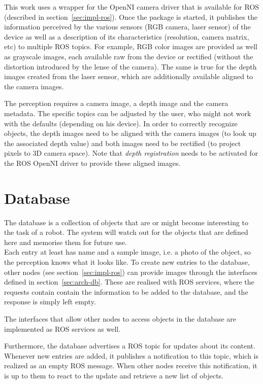 This work uses a wrapper for the OpenNI camera driver that is available for ROS (described in section~\ref{sec:impl-ros}). Once the package is started, it publishes the information perceived by the various sensors (RGB camera, laser sensor) of the device as well as a description of its characteristics (resolution, camera matrix, etc) to multiple ROS topics. For example, RGB color images are provided as well as grayscale images, each available raw from the device or rectified (without the distortion introduced by the lense of the camera). The same is true for the depth images created from the laser sensor, which are additionally available aligned to the camera images.

The perception requires a camera image, a depth image and the camera metadata. The specific topics can be adjusted by the user, who might not work with the defaults (depending on his device). In order to correctly recognize objects, the depth images need to be aligned with the camera images (to look up the associated depth value) and both images need to be rectified (to project pixels to 3D camera space). Note that \textit{depth registration} needs to be activated for the ROS OpenNI driver to provide these aligned images.


\section{Database}
\label{sec:impl-db}
The database is a collection of objects that are or might become interesting to the task of a robot. The system will watch out for the objects that are defined here and memorise them for future use. \\

Each entry at least has name and a sample image, i.e. a photo of the object, so the perception knows what it looks like. To create new entries to the database, other nodes (see section~\ref{sec:impl-ros}) can provide images through the interfaces defined in section~\ref{sec:arch-db}. These are realised with ROS services, where the requests contain contain the information to be added to the database, and the response is simply left empty.

The interfaces that allow other nodes to access objects in the database are implemented as ROS services as well.

Furthermore, the database advertises a ROS topic for updates about its content. Whenever new entries are added, it publishes a notification to this topic, which is realized as an empty ROS message. When other nodes receive this notification, it is up to them to react to the update and retrieve a new list of objects. \\

